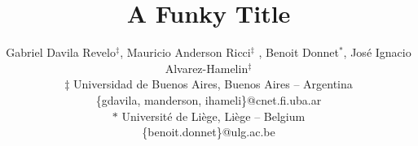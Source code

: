 \documentclass[conference]{IEEEtran} %
\begin{document}
\title{A Funky Title}
\author{Gabriel Davila Revelo{$^{\ddag}$}, Mauricio Anderson Ricci{$^{\ddag}$} , Benoit Donnet{$^{\ast}$},
Jos\'e Ignacio Alvarez-Hamelin{$^{\ddag}$}\\
$\ddag$ Universidad de Buenos Aires, Buenos Aires -- Argentina\\ 
\{gdavila, manderson, ihameli\}@cnet.fi.uba.ar \\
$\ast$ Universit\'e de Li\`ege, Li\`ege -- Belgium\\
\{benoit.donnet\}@ulg.ac.be
}

\maketitle











{\small
 
 
}
\end{document}

